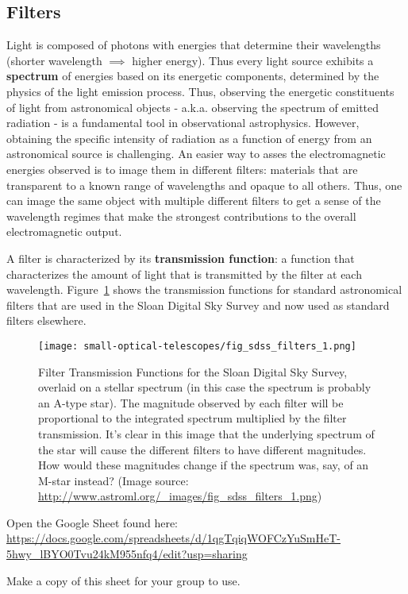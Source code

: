 \subsection{Filters}
Light is composed of photons with energies that determine their wavelengths (shorter wavelength $\implies$ higher energy). Thus every light source exhibits a \textbf{spectrum} of energies based on its energetic components, determined by the physics of the light emission process. Thus, observing the energetic constituents of light from astronomical objects - a.k.a. observing the spectrum of emitted radiation - is a fundamental tool in observational astrophysics. However, obtaining the specific intensity of radiation as a function of energy from an astronomical source is challenging. An easier way to asses the electromagnetic energies observed is to image them in different filters: materials that are transparent to a known range of wavelengths and opaque to all others. Thus, one can image the same object with multiple different filters to get a sense of the wavelength regimes that make the strongest contributions to the overall electromagnetic output.

A filter is characterized by its \textbf{transmission function}: a function that characterizes the amount of light that is transmitted by the filter at each wavelength. Figure~\ref{sot:fig:filters} shows the transmission functions for standard astronomical filters that are used in the Sloan Digital Sky Survey and now used as standard filters elsewhere.%

\begin{figure}
	\centering
	\texttt{[image: small-optical-telescopes/fig\_sdss\_filters\_1.png]}
	\caption{Filter Transmission Functions for the Sloan Digital Sky Survey, overlaid on a stellar spectrum (in this case the spectrum is probably an
		A-type star). The magnitude observed by each filter will be proportional to the integrated spectrum multiplied by the filter transmission. It's clear in this image that the underlying spectrum of the star will cause the different filters to have different magnitudes. How would these magnitudes change if the spectrum was, say, of an M-star instead? (Image source: \url{http://www.astroml.org/\_images/fig\_sdss\_filters\_1.png})}\label{sot:fig:filters}
\end{figure}

\begin{steps}
	\item Open the Google Sheet found here: \url{https://docs.google.com/spreadsheets/d/1qgTqiqWOFCzYuSmHeT-5hwy_lBYO0Tvu24kM955nfq4/edit?usp=sharing}
	
	\item Make a copy of this sheet for your group to use.
\end{steps}

